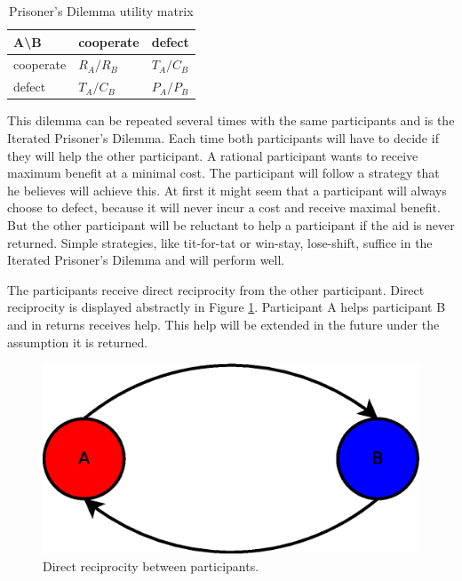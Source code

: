 \begin{table}
\center
	\begin{tabular}{l|ll}
	A\textbackslash B       & cooperate  & defect     \\ \hline
	cooperate & $R_A /R_B$ & $T_A /C_B$ \\
	defect    & $T_A /C_B$ & $P_A /P_B$
	\end{tabular}
\caption{Prisoner's Dilemma utility matrix}
\label{tab:pd-um}
\end{table}

This dilemma can be repeated several times with the same participants and is the Iterated Prisoner's Dilemma.
Each time both participants will have to decide if they will help the other participant.
A rational participant wants to receive maximum benefit at a minimal cost.
The participant will follow a strategy that he believes will achieve this.
At first it might seem that a participant will always choose to defect,
because it will never incur a cost and receive maximal benefit.
But the other participant will be reluctant to help a participant if the aid is never returned.
Simple strategies, like tit-for-tat or win-stay, lose-shift, suffice in the Iterated Prisoner's Dilemma
and will perform well\cite{Nowak-Cooperation}.

The participants receive direct reciprocity from the other participant\cite{Nowak-Cooperation}.
Direct reciprocity is displayed abstractly in Figure \ref{fig:direct-reciprocity}.
Participant A helps participant B and in returns receives help.
This help will be extended in the future under the assumption it is returned.

\begin{figure}
	\centerline{\includegraphics[scale=0.3]{problemDescription/figs/direct-reciprocity.eps}}
	\caption{Direct reciprocity between participants.}
	\label{fig:direct-reciprocity}
\end{figure}

